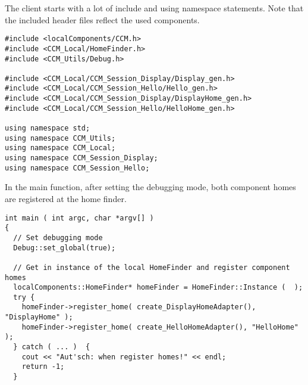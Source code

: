 \noindent
The client starts with a lot of include and using namespace statements.
Note that the included header files reflect the used components.
\begin{small}
\begin{verbatim}
#include <localComponents/CCM.h>
#include <CCM_Local/HomeFinder.h>
#include <CCM_Utils/Debug.h>

#include <CCM_Local/CCM_Session_Display/Display_gen.h>
#include <CCM_Local/CCM_Session_Hello/Hello_gen.h>
#include <CCM_Local/CCM_Session_Display/DisplayHome_gen.h>
#include <CCM_Local/CCM_Session_Hello/HelloHome_gen.h>

using namespace std;
using namespace CCM_Utils;
using namespace CCM_Local;
using namespace CCM_Session_Display;
using namespace CCM_Session_Hello;
\end{verbatim}
\end{small}

\noindent
In the main function, after setting the debugging mode, 
both component homes are registered at the home finder.
\begin{small}
\begin{verbatim}
int main ( int argc, char *argv[] )
{
  // Set debugging mode
  Debug::set_global(true);

  // Get in instance of the local HomeFinder and register component homes
  localComponents::HomeFinder* homeFinder = HomeFinder::Instance (  );
  try {                       
    homeFinder->register_home( create_DisplayHomeAdapter(), "DisplayHome" );
    homeFinder->register_home( create_HelloHomeAdapter(), "HelloHome" );
  } catch ( ... )  {
    cout << "Aut'sch: when register homes!" << endl;
    return -1;
  }
\end{verbatim}
\end{small}

